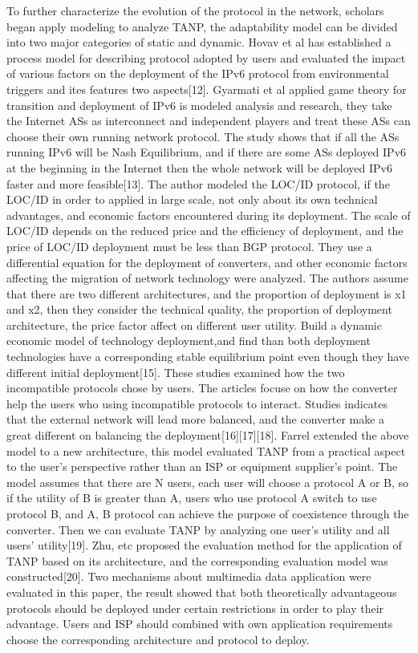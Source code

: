 \documentclass{article}
\begin{document}
To further characterize the evolution of the protocol in the network, scholars began apply modeling to analyze TANP, the adaptability model can be divided into two major categories of static and dynamic. Hovav et al has established a process model for describing protocol adopted by users and evaluated the impact of various factors on the deployment of the IPv6 protocol from environmental triggers and ites features two aspects[12]. Gyarmati et al applied game theory for transition and deployment of IPv6 is modeled analysis and research, they take the Internet ASs as interconnect and independent players and treat these ASs can choose their own running network protocol. The study shows that if all the ASs running IPv6 will be Nash Equilibrium, and if there are some ASs deployed IPv6 at the beginning in the Internet then the whole network will be deployed IPv6 faster and more feasible[13]. The author modeled the LOC/ID protocol, if the LOC/ID in order to applied in large scale, not only about its own technical advantages, and economic factors encountered during its deployment. The scale of LOC/ID depends on the reduced price and the efficiency of deployment, and the price of LOC/ID deployment must be less than BGP protocol. They use a differential equation for the deployment of converters, and other economic factors affecting the migration of network technology were analyzed.  The authors assume that there are two different architectures, and the proportion of deployment is x1 and x2, then they consider the technical quality, the proportion of deployment architecture, the price factor affect on different user utility. Build a dynamic economic model of technology deployment,and find than both deployment technologies have a corresponding stable equilibrium point  even though they have different initial deployment[15]. These studies examined how the two incompatible protocols chose by users. The articles focuse on how the converter help the users who using incompatible protocols to interact. Studies indicates that the external network will lead more balanced, and the converter make a great different on balancing the deployment[16][17][18]. Farrel extended the above model to a new architecture,  this model evaluated TANP from a practical aspect to the user's perspective rather than an ISP or equipment supplier's point. The model assumes that there are N users, each user will choose a protocol A or B, so if the utility of B is greater than A, users who use protocol A switch to use protocol B, and A, B protocol can achieve the purpose of coexistence through the converter. Then we can evaluate TANP by analyzing one user's utility and all users' utility[19]. Zhu, etc proposed the evaluation method for the application of TANP based on its architecture,  and the corresponding evaluation model was constructed[20]. Two mechanisms about multimedia data application were evaluated in this paper, the result showed that both theoretically advantageous protocols should be deployed under certain restrictions in order to play their advantage. Users and ISP should combined with own application requirements choose the corresponding architecture and protocol to deploy. 
\end{document}
